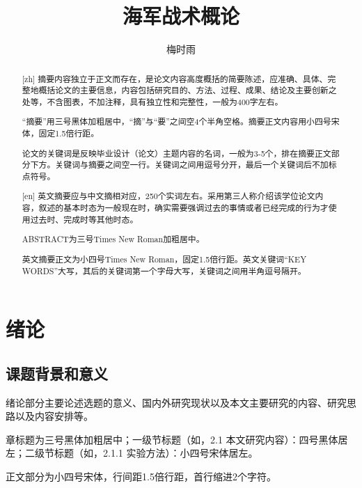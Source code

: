 \documentclass{seuthesis-2019}
\title{海军战术概论}{现代化海战}
\author{梅时雨}
\begin{document}
\maketitle
\makedeclaration
\frontmatter
\begin{abstract}[zh]
摘要内容独立于正文而存在，是论文内容高度概括的简要陈述，应准确、具体、完整地概括论文的主要信息，内容包括研究目的、方法、过程、成果、结论及主要创新之处等，不含图表，不加注释，具有独立性和完整性，一般为400字左右。

“摘要”用三号黑体加粗居中，“摘”与“要”之间空4个半角空格。摘要正文内容用小四号宋体，固定1.5倍行距。

论文的关键词是反映毕业设计（论文）主题内容的名词，一般为3-5个，排在摘要正文部分下方。关键词与摘要之间空一行。关键词之间用逗号分开，最后一个关键词后不加标点符号。
\end{abstract}

\begin{abstract}[en]
英文摘要应与中文摘相对应，250个实词左右。采用第三人称介绍该学位论文内容，叙述的基本时态为一般现在时，确实需要强调过去的事情或者已经完成的行为才使用过去时、完成时等其他时态。

ABSTRACT为三号Times New Roman加粗居中。

英文摘要正文为小四号Times New Roman，固定1.5倍行距。英文关键词“KEY WORDS”大写，其后的关键词第一个字母大写，关键词之间用半角逗号隔开。
\end{abstract}
\tableofcontents
\mainmatter
\chapter{绪论}
\section{课题背景和意义}
绪论部分主要论述选题的意义、国内外研究现状以及本文主要研究的内容、研究思路以及内容安排等。

章标题为三号黑体加粗居中；一级节标题（如，2.1 本文研究内容）：四号黑体居左；二级节标题（如，2.1.1 实验方法）：小四号宋体居左。

正文部分为小四号宋体，行间距1.5倍行距，首行缩进2个字符。
\end{document}
